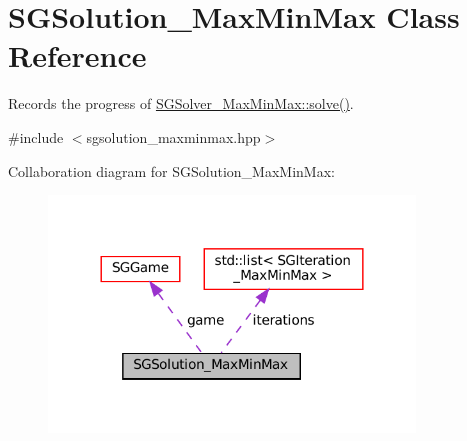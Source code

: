 \hypertarget{classSGSolution__MaxMinMax}{}\section{S\+G\+Solution\+\_\+\+Max\+Min\+Max Class Reference}
\label{classSGSolution__MaxMinMax}


Records the progress of \hyperlink{classSGSolver__MaxMinMax_aad121e84c1492524e439ffba05893f3d}{S\+G\+Solver\+\_\+\+Max\+Min\+Max\+::solve()}.  




{\ttfamily \#include $<$sgsolution\+\_\+maxminmax.\+hpp$>$}



Collaboration diagram for S\+G\+Solution\+\_\+\+Max\+Min\+Max\+:
\nopagebreak
\begin{figure}[H]
\begin{center}
\leavevmode
\includegraphics[width=276pt]{classSGSolution__MaxMinMax__coll__graph}
\end{center}
\end{figure}

